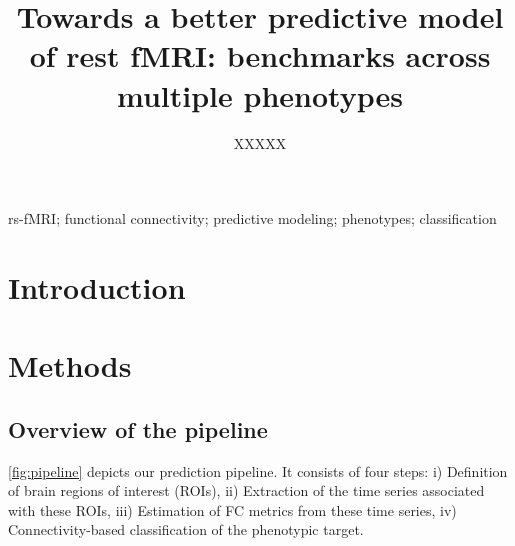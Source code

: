 \documentclass[5p]{elsarticle}
\begin{document}

\title{Towards a better predictive model of rest fMRI: benchmarks across
multiple phenotypes}


\author[parietal,cea]{XXXXX}


\address[parietal]{Parietal project-team, INRIA Saclay-\^ile de France,
France}
\address[cea]{CEA/Neurospin b\^at 145, 91191 Gif-Sur-Yvette, France}


\begin{abstract}
%
%
\end{abstract}

\begin{keyword}
    rs-fMRI; functional connectivity; predictive modeling; phenotypes;
    classification
\end{keyword}

\maketitle%

\vspace*{-3em}%

\sloppy %

\section{Introduction}%




\section{Methods}

\subsection{Overview of the pipeline}
\autoref{fig:pipeline}  depicts  our  prediction  pipeline.  It  consists  of  four
steps: i) Definition  of  brain  regions  of  interest  (ROIs),
ii) Extraction  of  the  time  series  associated  with  these  ROIs,
iii) Estimation  of  FC  metrics  from  these  time  series,
iv) Connectivity-based classification of the phenotypic target.
\end{document}

